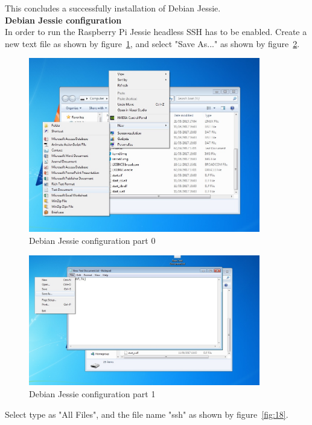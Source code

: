 \documentclass[12pt,]{article}
\begin{document}
This concludes a successfully installation of Debian Jessie.\\
\textbf{Debian Jessie configuration}\\
In order to run the Raspberry Pi Jessie headless SSH has to be enabled.
Create a new text file as shown by figure~\ref{fig:20}, and select "Save As..." as shown by figure~\ref{fig:17}.
\begin{figure}[H]
  	\begin{center}
    	\includegraphics[width=0.9\textwidth]{Ras_1}
  	\end{center}
  	\caption{Debian Jessie configuration part 0}
	\label{fig:20}
\end{figure}
\begin{figure}[H]
  	\begin{center}
    	\includegraphics[width=0.9\textwidth]{Ras_1,1}
  	\end{center}
  	\caption{Debian Jessie configuration part 1}
	\label{fig:17}
\end{figure}
Select type as "All Files", and the file name "ssh" as shown by figure~\ref{fig:18}.
\end{document}

